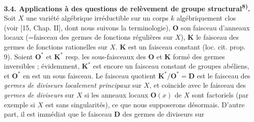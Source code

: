 \indent\textbf{3.4. Applications à des questions de relèvement de groupe
structural\textsuperscript{8)}.} Soit $X$ une variété algébrique irréductible
sur un corps $k$ algébriquement clos (voir [15, Chap. II], dont nous suivons
la terminologie), $\mathbf O$ son faisceau d'anneaux locaux (=faisceau des
germes de fonctions régulières sur $X$), $\mathbf K$ le faisceau des germes de
fonctions rationelles sur $X$. $\mathbf K$ est un faisceau constant
(loc. cit. prop. 9). Soient $\mathbf O^*$ et $\mathbf K^*$ resp. les
sous-faisceaux des $\mathbf O$ et $\mathbf K$ formé des germes inversibles ;
évidemment, $\mathbf K^*$ est encore un faisceau constant de groupes
abéliens, et $\mathbf O^*$ en est un sous faisceau.
Le faisceau quotient $\mathbf K^*/\mathbf O^*=\mathbf D$ est le faisceau des
\textit{germes de diviseurs localement principaux} sur $X$, et coïncide avec
le faisceau des \textit{germes de diviseurs} sur $X$ si les anneaux locaux
$\mathbf O(x)$ de $X$ sont factoriels (par exemple si $X$ est sans
singularités), ce que nous supposerons désormais. D'autre part, il est
immédiat que le faisceau $\mathbf D$ des germes de diviseurs sur



